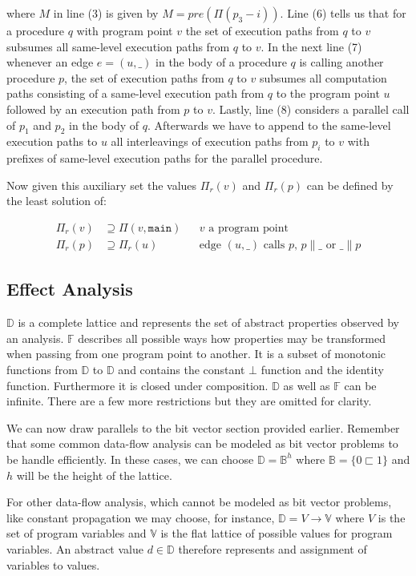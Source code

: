 \documentclass[article]{uibk}
\begin{document}
where $M$ in line (3) is given by $M = pre(\Pi(p_3 - i))$. Line (6) tells us
that for a procedure $q$ with program point $v$ the set of execution paths from
$q$ to $v$ subsumes all same-level execution paths from $q$ to $v$. In the next
line (7) whenever an edge $e = (u,\_)$ in the body of a procedure $q$ is
calling another procedure $p$, the set of execution paths from $q$ to $v$
subsumes all computation paths consisting of a same-level execution path from
$q$ to the program point $u$ followed by an execution path from $p$ to $v$.
Lastly, line (8) considers a parallel call of $p_1$ and $p_2$ in the body of
$q$. Afterwards we have to append to the same-level execution paths to $u$ all
interleavings of execution paths from $p_i$ to $v$ with prefixes of same-level
execution paths for the parallel procedure.

Now given this auxiliary set the values $\Pi_r(v)$ and $\Pi_r(p)$ can be
defined by the least solution of:

\begin{align}
    \Pi_r(v) &\supseteq \Pi(v, \texttt{main}) && \text{$v$ a program point} \\
    \Pi_r(p) &\supseteq \Pi_r(u)              && \text{edge $(u,\_)$ calls $p$, $p \parallel \_$ or $\_ \parallel p$}
\end{align}

\subsection{Effect Analysis}

$\mathbb{D}$ is a complete lattice and represents the set of abstract
properties observed by an analysis. $\mathbb{F}$ describes all possible ways
how properties may be transformed when passing from one program point to
another. It is a subset of monotonic functions from $\mathbb{D}$ to
$\mathbb{D}$ and contains the constant $\bot$ function and the identity
function. Furthermore it is closed under composition. $\mathbb{D}$ as well as
$\mathbb{F}$ can be infinite. There are a few more restrictions but they are
omitted for clarity.~\cite{parallel_cba}

We can now draw parallels to the bit vector section provided earlier. Remember
that some common data-flow analysis can be modeled as bit vector problems to be
handle efficiently. In these cases, we can choose $\mathbb{D} = \mathbb{B}^h$
where $\mathbb{B} = \{0 \sqsubset 1\}$ and $h$ will be the height of the
lattice.

For other data-flow analysis, which cannot be modeled as bit vector problems,
like constant propagation we may choose, for instance, $\mathbb{D} = V \to
\mathbb{V}$ where $V$ is the set of program variables and $\mathbb{V}$ is the
flat lattice of possible values for program variables. An abstract value $d \in
\mathbb{D}$ therefore represents and assignment of variables to values.
\end{document}
